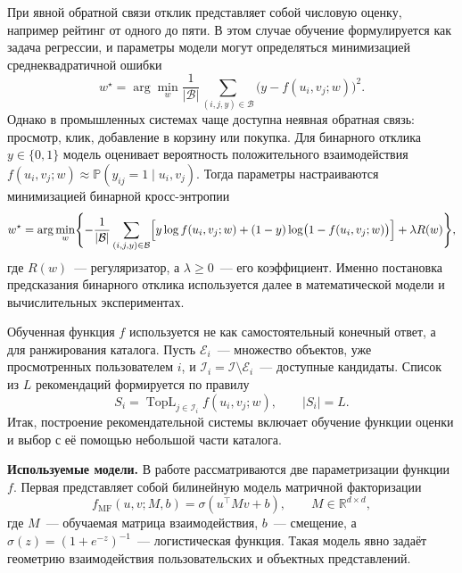 При явной обратной связи отклик представляет собой числовую оценку, например
рейтинг от одного до пяти. В этом случае обучение формулируется как задача
регрессии, и параметры модели могут определяться минимизацией среднеквадратичной
ошибки
\begin{equation}
    w^\star
    =\arg\min_w
    \frac{1}{|\mathcal B|}
    \sum_{(i,j,y)\in\mathcal B}
    \bigl(y-f(u_i,v_j;w)\bigr)^2.
    \label{eq:static_mse}
\end{equation}
Однако в промышленных системах чаще доступна неявная обратная связь: просмотр,
клик, добавление в корзину или покупка. Для бинарного отклика $y\in\{0,1\}$ модель оценивает
вероятность положительного взаимодействия
$f(u_i,v_j;w)\approx\mathbb P(y_{ij}=1\mid u_i,v_j)$. Тогда параметры
настраиваются минимизацией бинарной кросс-энтропии
\begin{equation}
    \begin{aligned}
    w^\star=\arg\min_w\Biggl\{
    -\frac{1}{|\mathcal B|}
    \sum_{(i,j,y)\in\mathcal B}
    \Bigl[
        y\log f(u_i,v_j;w)
        +(1-y)\log\bigl(1-f(u_i,v_j;w)\bigr)
    \Bigr]
    +\lambda R(w)
    \Biggr\},
    \end{aligned}
    \label{eq:static_bce}
\end{equation}
где $R(w)$~--- регуляризатор, а $\lambda\ge0$~--- его коэффициент. Именно
постановка предсказания бинарного отклика используется далее в математической
модели и вычислительных экспериментах.

Обученная функция $f$ используется не как самостоятельный конечный ответ, а для
ранжирования каталога. Пусть $\mathcal E_i$~--- множество объектов, уже
просмотренных пользователем $i$, и
$\mathcal I_i=\mathcal I\setminus\mathcal E_i$~--- доступные кандидаты. Список
из $L$ рекомендаций формируется по правилу
\begin{equation}
    S_i
    =\operatorname{TopL}_{j\in\mathcal I_i} f(u_i,v_j;w),
    \qquad |S_i|=L.
    \label{eq:static_top_l}
\end{equation}
Итак, построение рекомендательной системы включает обучение функции оценки и
выбор с её помощью небольшой части каталога.

\textbf{Используемые модели.} В работе рассматриваются две параметризации
функции $f$. Первая представляет собой билинейную модель матричной факторизации
\begin{equation}
    f_{\mathrm{MF}}(u,v;M,b)
    =\sigma(u^\top Mv+b),
    \qquad M\in\mathbb R^{d\times d},
    \label{eq:mf_score}
\end{equation}
где $M$~--- обучаемая матрица взаимодействия, $b$~--- смещение, а
$\sigma(z)=(1+e^{-z})^{-1}$~--- логистическая функция. Такая модель явно
задаёт геометрию взаимодействия пользовательских и объектных представлений.

